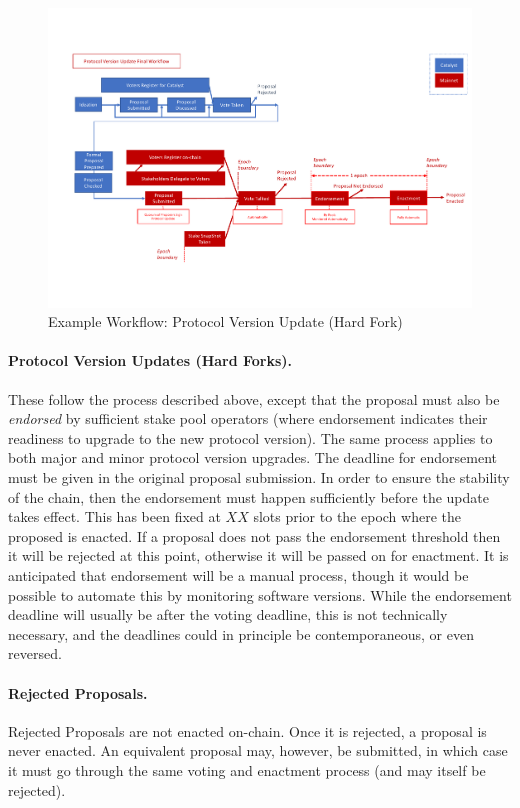 \begin{figure}
  \includegraphics[trim=0 90 0 80,clip,width=\textwidth]{Workflow4}
  \caption{Example Workflow: Protocol Version Update (Hard Fork)}
  \label{fig:workflow-hf}
\end{figure}

\paragraph{Protocol Version Updates (Hard Forks).}  These follow the process described above,
except that the proposal must also be \emph{endorsed} by sufficient stake pool operators
(where endorsement indicates their readiness to upgrade to the new protocol version).
The same process applies to both major and minor protocol version upgrades.
The deadline for endorsement must be given in the original proposal submission.
In order to ensure the stability of the chain, then the endorsement must happen sufficiently before the update takes
effect.  This has been fixed at $XX$ slots prior to the epoch where the proposed is enacted.
If a proposal does not pass the endorsement threshold then it will be rejected at this point, otherwise it will be
passed on for enactment.  It is anticipated that endorsement will be a manual process, though it would be possible
to automate this by monitoring software versions.
While the endorsement deadline will usually be after the voting deadline, this is not technically necessary, and the deadlines could
in principle be contemporaneous, or even reversed.

\paragraph{Rejected Proposals.}  Rejected Proposals are not enacted on-chain.   Once it is rejected, a proposal is never enacted.
An equivalent proposal may, however, be submitted, in which case it must go through the same voting and enactment process
(and may itself be rejected).


